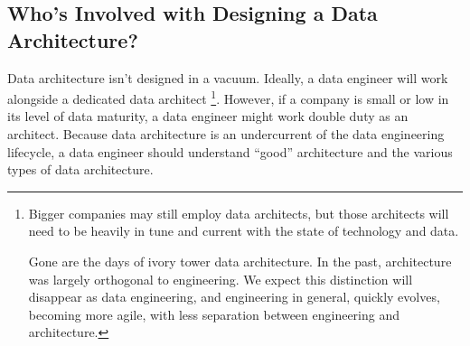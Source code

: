 \subsection{Who's Involved with Designing a Data Architecture?}
Data architecture isn't designed in a vacuum. Ideally, a data engineer
will work alongside a dedicated data architect
\footnote{
    Bigger companies may still employ data architects, but those
    architects will need to be heavily in tune and current with the
    state of technology and data.

    Gone are the days of ivory tower data architecture. In the past,
    architecture was largely orthogonal to engineering. We expect this
    distinction will disappear as data engineering, and engineering in
    general, quickly evolves, becoming more agile, with less
    separation between engineering and architecture.
}.
However, if a company
is small or low in its level of data maturity, a data engineer might
work double duty as an architect. Because data architecture is an
undercurrent of the data engineering lifecycle, a data engineer
should understand “good” architecture and the various types of data
architecture.



